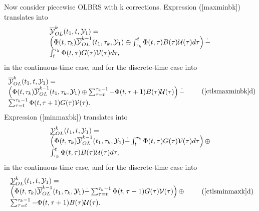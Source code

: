 \documentclass[letterpaper,10pt,english]{sphinxmanual}
\begin{document}
Now consider piecewise OLBRS with k corrections. Expression
({[}maxminbk{]}) translates into
\begin{gather}
\begin{split}\begin{array}{l}
\overline{{\mathcal Y}}_{OL}^k(t_1, t, {\mathcal Y}_1) = \\
\left(\Phi(t, \tau_k)\overline{{\mathcal Y}}_{OL}^{k-1}(t_1, \tau_k, {\mathcal Y}_1) \oplus
\int_{\tau_k}^t\Phi(t, \tau)B(\tau){\mathcal U}(\tau)d\tau\right) \dot{-} \\
\int^{\tau_k}_t\Phi(t, \tau)G(\tau){\mathcal V}(\tau)d\tau,
\end{array}
\label{ctlsmaxminbk}\end{split}\notag
\end{gather}
in the continuous-time case, and for the discrete-time case into
\begin{gather}
\begin{split}\begin{array}{l}
\overline{{\mathcal Y}}_{OL}^k(t_1, t, {\mathcal Y}_1) = \\
\left(\Phi(t, \tau_k)\overline{{\mathcal Y}}_{OL}^{k-1}(t_1, \tau_k, {\mathcal Y}_1) \oplus
\sum_{\tau=t}^{\tau_k-1}-\Phi(t, \tau+1)B(\tau){\mathcal U}(\tau)\right) \dot{-} \\
\sum_{\tau=t}^{\tau_k-1}\Phi(t, \tau+1)G(\tau){\mathcal V}(\tau).
\end{array}
\tag*{(\ref{ctlsmaxminbk}d)}
\label{dtlsmaxminbk}\end{split}\notag
\end{gather}
Expression ({[}minmaxbk{]}) translates into
\begin{gather}
\begin{split}\begin{array}{l}
\underline{{\mathcal Y}}_{OL}^k(t_1, t, {\mathcal Y}_1) = \\
\left(\Phi(t, \tau_k)\overline{{\mathcal Y}}_{OL}^{k-1}(t_1, \tau_k, {\mathcal Y}_1) \dot{-}
\int^{\tau_k}_t\Phi(t, \tau)G(\tau){\mathcal V}(\tau)d\tau\right)
\oplus \\
\int_{\tau_k}^t\Phi(t, \tau)B(\tau){\mathcal U}(\tau)d\tau,
\end{array}
\label{ctlsminmaxbk}\end{split}\notag
\end{gather}
in the continuous-time case, and for the discrete-time case into
\begin{gather}
\begin{split}\begin{array}{l}
\underline{{\mathcal Y}}_{OL}^k(t_1, t, {\mathcal Y}_1) = \\
\left(\Phi(t, \tau_k)\overline{{\mathcal Y}}_{OL}^{k-1}(t_1, \tau_k, {\mathcal Y}_1) \dot{-}
\sum_{\tau=t}^{\tau_k-1}\Phi(t, \tau+1)G(\tau){\mathcal V}(\tau)\right)
\oplus \\
\sum_{\tau=t}^{\tau_k-1}-\Phi(t, \tau+1)B(\tau){\mathcal U}(\tau).
\end{array}
\tag*{(\ref{ctlsminmaxk}d)}
\label{dtlsminmaxbk}\end{split}\notag
\end{gather}
\end{document}
